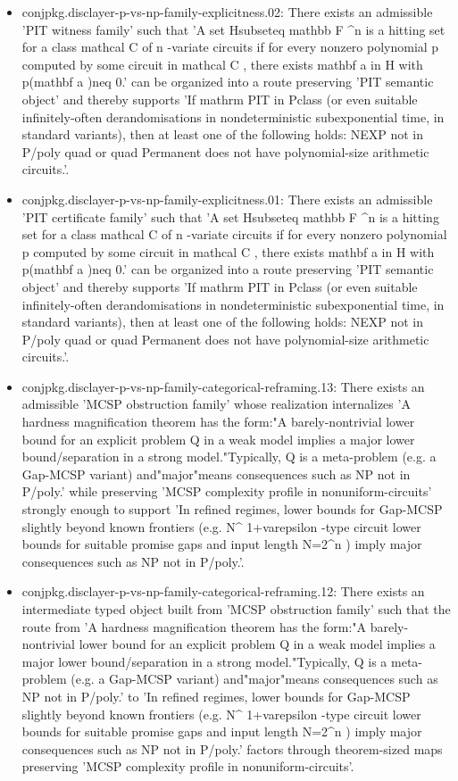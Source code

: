 \documentclass[11pt]{article}
\begin{document}
\begin{itemize}
\item conjpkg.disclayer-p-vs-np-family-explicitness.02: There exists an admissible 'PIT witness family' such that 'A set Hsubseteq mathbb F \textasciicircum{}n is a hitting set for a class mathcal C of n -variate circuits if for every nonzero polynomial p computed by some circuit in mathcal C , there exists mathbf a in H with p(mathbf a )neq 0.' can be organized into a route preserving 'PIT semantic object' and thereby supports 'If mathrm PIT in Pclass (or even suitable infinitely-often derandomisations in nondeterministic subexponential time, in standard variants), then at least one of the following holds: NEXP not in P/poly quad or quad Permanent does not have polynomial-size arithmetic circuits.'.
\item conjpkg.disclayer-p-vs-np-family-explicitness.01: There exists an admissible 'PIT certificate family' such that 'A set Hsubseteq mathbb F \textasciicircum{}n is a hitting set for a class mathcal C of n -variate circuits if for every nonzero polynomial p computed by some circuit in mathcal C , there exists mathbf a in H with p(mathbf a )neq 0.' can be organized into a route preserving 'PIT semantic object' and thereby supports 'If mathrm PIT in Pclass (or even suitable infinitely-often derandomisations in nondeterministic subexponential time, in standard variants), then at least one of the following holds: NEXP not in P/poly quad or quad Permanent does not have polynomial-size arithmetic circuits.'.
\item conjpkg.disclayer-p-vs-np-family-categorical-reframing.13: There exists an admissible 'MCSP obstruction family' whose realization internalizes 'A hardness magnification theorem has the form:"A barely-nontrivial lower bound for an explicit problem Q in a weak model implies a major lower bound/separation in a strong model."Typically, Q is a meta-problem (e.g. a Gap-MCSP variant) and"major"means consequences such as NP not in P/poly.' while preserving 'MCSP complexity profile in nonuniform-circuits' strongly enough to support 'In refined regimes, lower bounds for Gap-MCSP slightly beyond known frontiers (e.g. N\textasciicircum{} 1+varepsilon -type circuit lower bounds for suitable promise gaps and input length N=2\textasciicircum{}n ) imply major consequences such as NP not in P/poly.'.
\item conjpkg.disclayer-p-vs-np-family-categorical-reframing.12: There exists an intermediate typed object built from 'MCSP obstruction family' such that the route from 'A hardness magnification theorem has the form:"A barely-nontrivial lower bound for an explicit problem Q in a weak model implies a major lower bound/separation in a strong model."Typically, Q is a meta-problem (e.g. a Gap-MCSP variant) and"major"means consequences such as NP not in P/poly.' to 'In refined regimes, lower bounds for Gap-MCSP slightly beyond known frontiers (e.g. N\textasciicircum{} 1+varepsilon -type circuit lower bounds for suitable promise gaps and input length N=2\textasciicircum{}n ) imply major consequences such as NP not in P/poly.' factors through theorem-sized maps preserving 'MCSP complexity profile in nonuniform-circuits'.

\end{itemize}
\end{document}
